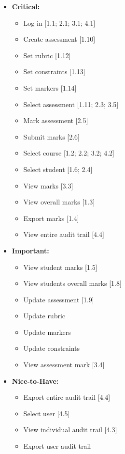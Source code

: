 \documentclass[12pt]{article}
\begin{document}
			\begin{itemize}
				\item \textbf{Critical:}
					\begin{itemize}
						\item Log in [1.1; 2.1; 3.1; 4.1]
						\item Create assessment [1.10]
						\item Set rubric [1.12]
						\item Set constraints [1.13]
						\item Set markers [1.14]
						\item Select assessment [1.11; 2.3; 3.5]
						\item Mark assessment [2.5]
						\item Submit marks [2.6]
						\item Select course [1.2; 2.2; 3.2; 4.2]						
						\item Select student [1.6; 2.4]	
						\item View marks [3.3]
						\item View overall marks [1.3]					
						\item Export marks [1.4]
						\item View entire audit trail [4.4]
					\end{itemize}
				\item \textbf{Important:}
					\begin{itemize}
						\item View student marks [1.5]
						\item View students overall marks [1.8]						
						\item Update assessment [1.9]
						\item Update rubric
						\item Update markers
						\item Update constraints
						\item View assessment mark [3.4]
					\end{itemize}
				\item \textbf{Nice-to-Have:}
					\begin{itemize}
						\item Export entire audit trail [4.4]
						\item Select user [4.5]
						\item View individual audit trail [4.3]
						\item Export user audit trail
					\end{itemize}
			\end{itemize}
			
\end{document}
